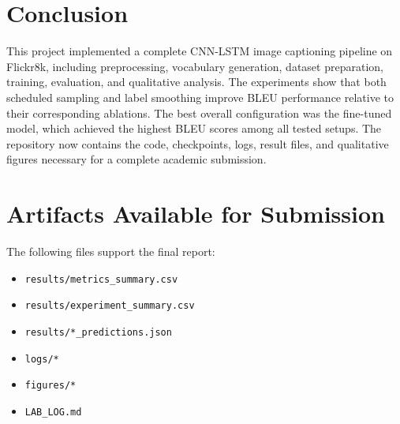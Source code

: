 \documentclass[11pt,a4paper]{article}
\begin{document}
\section{Conclusion}

This project implemented a complete CNN-LSTM image captioning pipeline on Flickr8k, including preprocessing, vocabulary generation, dataset preparation, training, evaluation, and qualitative analysis. The experiments show that both scheduled sampling and label smoothing improve BLEU performance relative to their corresponding ablations. The best overall configuration was the fine-tuned model, which achieved the highest BLEU scores among all tested setups. The repository now contains the code, checkpoints, logs, result files, and qualitative figures necessary for a complete academic submission.

\section*{Artifacts Available for Submission}

The following files support the final report:
\begin{itemize}[leftmargin=*]
    \item \texttt{results/metrics\_summary.csv}
    \item \texttt{results/experiment\_summary.csv}
    \item \texttt{results/*\_predictions.json}
    \item \texttt{logs/*}
    \item \texttt{figures/*}
    \item \texttt{LAB\_LOG.md}
\end{itemize}
\end{document}
